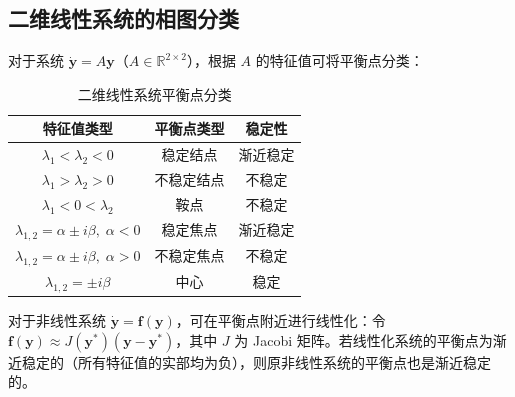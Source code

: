 \subsection{二维线性系统的相图分类}

对于系统 $\dot{\mathbf{y}} = A\mathbf{y}$（$A \in \mathbb{R}^{2\times2}$），根据 $A$ 的特征值可将平衡点分类：

\begin{table}[H]
	\centering
	\caption{二维线性系统平衡点分类}
	\begin{tabular}{ccc}
		\toprule
		特征值类型 & 平衡点类型 & 稳定性 \\
		\midrule
		$\lambda_1 < \lambda_2 < 0$ & 稳定结点 & 渐近稳定 \\
		$\lambda_1 > \lambda_2 > 0$ & 不稳定结点 & 不稳定 \\
		$\lambda_1 < 0 < \lambda_2$ & 鞍点 & 不稳定 \\
		$\lambda_{1,2} = \alpha \pm i\beta,\; \alpha < 0$ & 稳定焦点 & 渐近稳定 \\
		$\lambda_{1,2} = \alpha \pm i\beta,\; \alpha > 0$ & 不稳定焦点 & 不稳定 \\
		$\lambda_{1,2} = \pm i\beta$ & 中心 & 稳定 \\
		\bottomrule
	\end{tabular}
\end{table}

\begin{remark}
	对于非线性系统 $\dot{\mathbf{y}} = \mathbf{f}(\mathbf{y})$，可在平衡点附近进行线性化：令 $\mathbf{f}(\mathbf{y}) \approx J(\mathbf{y}^*)(\mathbf{y} - \mathbf{y}^*)$，其中 $J$ 为 Jacobi 矩阵。若线性化系统的平衡点为渐近稳定的（所有特征值的实部均为负），则原非线性系统的平衡点也是渐近稳定的。
\end{remark}
